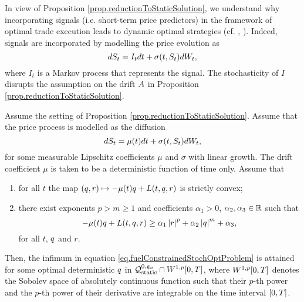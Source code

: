 \documentclass[10pt,a4paper]{article}
\begin{document}
\begin{remark}
In view of Proposition \ref{prop.reductionToStaticSolution}, we understand why incorporating signals (i.e. short-term price predictors) in the framework of optimal trade execution leads to dynamic optimal strategies (cf. \cite{CJ16inc}, \cite{LN19inc}). Indeed, signals are incorporated by modelling the price evolution as \[
dS_t = I_t dt + \sigma(t,S_t)dW_t,
\]
where $I_t$ is a Markov process that represents the signal. The stochasticity of $I$ disrupts the assumption on the drift $A$ in Proposition \ref{prop.reductionToStaticSolution}.
\end{remark}





\begin{corol}
\label{corol.reductionToOptimalStatic}
Assume the setting of Proposition \ref{prop.reductionToStaticSolution}. Assume that the  price  process is modelled as the diffusion 
\begin{equation}\label{eq.SDEofFundamentalPrice}
	dS_t = \mu(t)dt +\sigma(t,S_t)dW_t,
\end{equation}
for some measurable Lipschitz coefficients $\mu$ and $\sigma$ with linear growth. The drift coefficient $\mu$ is taken to be a deterministic function of time only.
Assume that  
\begin{enumerate}
		\item for all $t$ the map $(q, r)\mapsto -\mu(t)q + L(t,q,r)$ is strictly convex;
		\item there exist exponents $p>m\geq 1$ and coefficients $\alpha_1>0$, $\alpha_2,\alpha_3 \in \mathbb{R}$ such that 
		\begin{equation*}
		-\mu(t)q + L(t,q, r) \geq \alpha_1 \left\lvert {r} \right\rvert^{p} + \alpha_2 \left\lvert {q} \right\rvert^m + \alpha_3,
		\end{equation*}
		for all $t$, $q$ and $r$. 
\end{enumerate} 
Then, the infimum in equation \eqref{eq.fuelConstrainedStochOptProblem} is attained for some optimal deterministic $q$ in $\mathcal{Q}_{\text{static}}^{0,\mathfrak{q_0}} \cap W^{1,p}{[0,T]}$, where $W^{1,p}{[0,T]}$ denotes the Sobolev space of absolutely continuous function such that their $p$-th power and the $p$-th power of their derivative are integrable on the time interval ${[0,T]}$. 
\end{corol}
\end{document}
